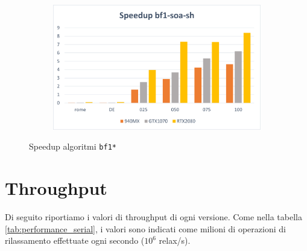 \documentclass[12pt,a4paper]{book} %
\begin{document}
\begin{figure}[b]
\begin{subfigure}{.5\textwidth}
		\end{subfigure}%
		\begin{subfigure}{.5\textwidth}
			\centering
			\includegraphics[width=\textwidth]{speedup_bf1-soa-sh}
		\end{subfigure}
		\caption{Speedup algoritmi \texttt{bf1*}}
		\label{fig:speedup_bf1}
	\end{figure}
	
	\section{Throughput}
	Di seguito riportiamo i valori di throughput di ogni versione. Come nella tabella \ref{tab:performance_serial}, i valori sono indicati come milioni di operazioni di rilassamento effettuate ogni secondo ($10^6$ relax/s).
	
\end{document}
